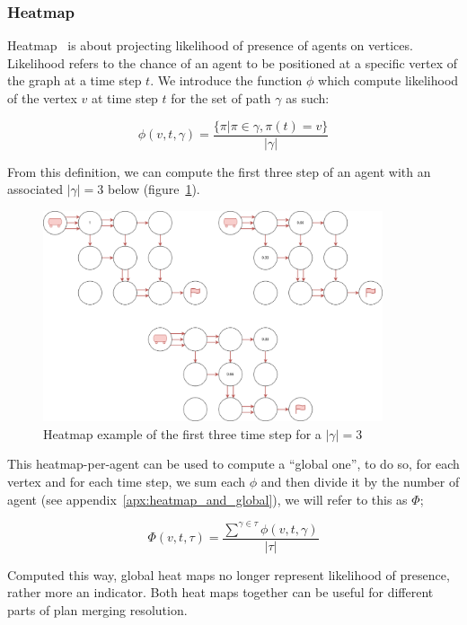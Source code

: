 \subsubsection{Heatmap}\label{sec:heatmap-}

Heatmap~\cite{atstfestko20a} is about projecting likelihood of presence of agents on vertices. Likelihood refers to the chance of an agent to be positioned at a specific vertex of the graph at a time step \(t\). We introduce the function \(\phi\) which compute likelihood of the vertex \(v\) at time step \(t\) for the set of path \(\gamma\) as such:

\[
  \phi(v, t, \gamma) = \frac{ \{ \pi | \pi \in \gamma, \pi(t) = v \}}{|\gamma| }
\]

From this definition, we can compute the first three step of an agent with an associated \(|\gamma|=3\) below (figure~\ref{img:heatmap}).

\begin{figure}[H]
  \centering
  \caption{Heatmap example of the first three time step for a \(|\gamma|=3\) }\label{img:heatmap}
  \includegraphics[width=10cm]{img/heatmap.drawio.png}
\end{figure}

This heatmap-per-agent can be used to compute a ``global one'', to do so, for each vertex and for each time step, we sum each \(\phi\) and then divide it by the number of agent (see appendix~\ref{apx:heatmap_and_global}), we will refer to this as \(\Phi\);

\[
  \Phi(v,t,\tau) = \frac{ {\sum^{\gamma \in \tau} }{\phi(v,t,\gamma)}}  {|\tau|}
\]



Computed this way, global heat maps no longer represent likelihood of presence, rather more an indicator. Both heat maps together can be useful for different parts of plan merging resolution.



